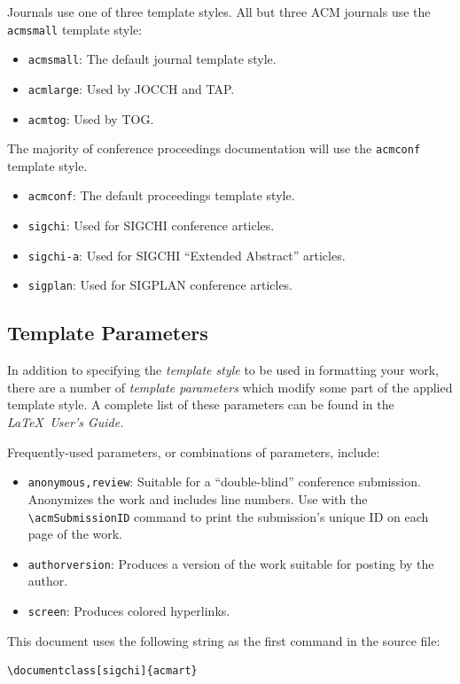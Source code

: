 \documentclass[sigchi]{acmart}
\begin{document}
Journals use one of three template styles. All but three ACM journals
use the {\verb|acmsmall|} template style:
\begin{itemize}
\item {\verb|acmsmall|}: The default journal template style.
\item {\verb|acmlarge|}: Used by JOCCH and TAP.
\item {\verb|acmtog|}: Used by TOG.
\end{itemize}

The majority of conference proceedings documentation will use the {\verb|acmconf|} template style.
\begin{itemize}
\item {\verb|acmconf|}: The default proceedings template style.
\item{\verb|sigchi|}: Used for SIGCHI conference articles.
\item{\verb|sigchi-a|}: Used for SIGCHI ``Extended Abstract'' articles.
\item{\verb|sigplan|}: Used for SIGPLAN conference articles.
\end{itemize}

\subsection{Template Parameters}

In addition to specifying the {\itshape template style} to be used in
formatting your work, there are a number of {\itshape template parameters}
which modify some part of the applied template style. A complete list
of these parameters can be found in the {\itshape \LaTeX\ User's Guide.}

Frequently-used parameters, or combinations of parameters, include:
\begin{itemize}
\item {\verb|anonymous,review|}: Suitable for a ``double-blind''
  conference submission. Anonymizes the work and includes line
  numbers. Use with the \verb|\acmSubmissionID| command to print the
  submission's unique ID on each page of the work.
\item{\verb|authorversion|}: Produces a version of the work suitable
  for posting by the author.
\item{\verb|screen|}: Produces colored hyperlinks.
\end{itemize}

This document uses the following string as the first command in the
source file:
\begin{verbatim}
\documentclass[sigchi]{acmart}
\end{verbatim}
\end{document}
